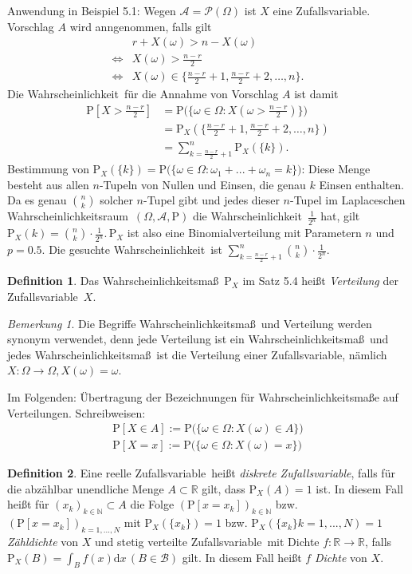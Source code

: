 \documentclass[a4paper,12pt,fleqn]{scrartcl}
\newcommand{\N}{\mathbb{N}}
\newcommand{\R}{\mathbb{R}}
\newcommand{\m}[1]{\mathcal{ #1 }}
\newcommand{\p}[1]{\text{P(} #1 \text{)}}
\newcommand{\WR}{Wahrscheinlichkeitsraum}
\newcommand{\WM}{Wahrscheinlichkeitsmaß}
\newcommand{\Wk}{Wahrscheinlichkeit}
\newcommand{\ZV}{Zufallsvariable}
\theoremstyle{definition}
\newtheorem{definition}{Definition}[section]
\theoremstyle{plain}
\theoremstyle{remark}
\newtheorem*{bemerkung}{Bemerkung}
\begin{document}
Anwendung in Beispiel 5.1: Wegen $\m{A} = \m{P}( \Omega) $ ist $X$ eine \ZV. Vorschlag $A$ wird anngenommen, falls gilt
\begin{align*}
&r + X(\omega) > n - X( \omega ) \\
\Leftrightarrow &X( \omega) > \frac{n-r}{2} \\
\Leftrightarrow &X( \omega) \in \{ \frac{n-r}{2}+1,\frac{n-r}{2}+2, \ldots ,n \}.
\end{align*}  
Die \Wk \, für die Annahme von Vorschlag $A$ ist damit 
\begin{align*}
\text{P}[X > \frac{n-r}{2} ] &= \p{\{ \omega \in \Omega : X( \omega >  \frac{n-r}{2})\}} \\
&= \text{P}_X( \{ \frac{n-r}{2}+1,\frac{n-r}{2}+2, \ldots ,n \} ) \\
&= \sum_{k = \frac{n-r}{2}+1}^n {\text{P}_X( \{ k \} )}.
\end{align*}  
Bestimmung von $\text{P}_X( \{ k \} ) = \p{\{ \omega \in \Omega : \omega_1 + ... + \omega_n = k \}}$:  Diese Menge besteht aus allen $n$-Tupeln von Nullen und Einsen, die genau $k$ Einsen enthalten. Da es genau  $\binom{n}{k}$ solcher $n$-Tupel gibt und jedes dieser $n$-Tupel im Laplaceschen \WR \, $( \Omega , \m{A} , \text{P})$ die \Wk \, $\frac{1}{2^n}$ hat, gilt $\text{P}_X(k) = \binom{n}{k} \cdot \frac{1}{2^n}. \, \text{P}_X$  ist also eine Binomialverteilung mit Parametern $n$ und $p = 0.5$. Die gesuchte \Wk \, ist $\sum_{k= \frac{n-r}{2} +1}^n{\binom{n}{k} \cdot \frac{1}{2^n}}$.
\begin{definition}
Das \WM \, $\text{P}_X$ im Satz 5.4 heißt \emph{Verteilung} der \ZV \, $X$.
\end{definition}
\begin{bemerkung}
Die Begriffe \WM \, und Verteilung werden synonym verwendet, denn jede Verteilung ist ein \WM \, und jedes \WM \, ist die Verteilung einer \ZV, nämlich $X: \Omega \rightarrow \Omega, X( \omega) = \omega $.
\end{bemerkung}
Im Folgenden: Übertragung der Bezeichnungen für \WM e auf Verteilungen. Schreibweisen: 
\begin{align*}
\text{P}[X \in A] := \p{\{ \omega \in \Omega : X(\omega ) \in A \}} \\
\text{P}[X = x] := \p{\{ \omega \in \Omega : X(\omega ) = x \}}
\end{align*}
\begin{definition}
Eine reelle \ZV \, heißt \emph{diskrete \ZV}, falls für die abzählbar unendliche Menge $ A \subset \R $ gilt, dass $\text{P}_X(A) = 1 $ ist. In diesem Fall heißt für $(x_k)_{k \in \N } \subset A $ die Folge $ (\text{P}[x = x_k])_{k \in \N } $ bzw. $(\text{P}[x = x_k])_{k = 1,...,N } $ mit $\text{P}_X( \{ x_k \} ) = 1$ bzw. $\text{P}_X( \{ x_k \} k = 1,...,N ) = 1$ \emph{Zähldichte} von $X$ und stetig verteilte \ZV \, mit Dichte $ f: \R \rightarrow \R $, falls $ \text{P}_X(B) = \int_B f(x) \mathrm{d}x \, ( B \in \m{B} ) $ gilt. In diesem Fall heißt $f$ \emph{Dichte} von $X$.
\end{definition}
\end{document}

